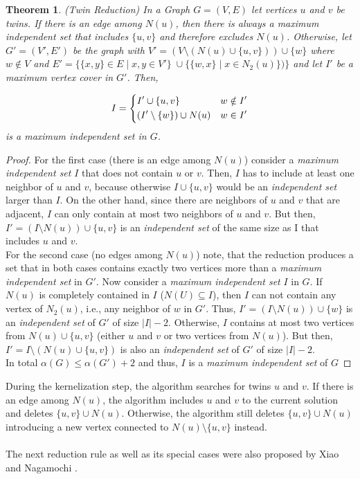 \documentclass[]{article}
\newtheorem{theorem}{Theorem}
\begin{document}
\begin{theorem} (Twin Reduction) In a Graph $G=(V,E)$ let vertices $u$ and $v$ be twins. If there is an edge among $N(u)$, then there is always a \textit{maximum independent set} that includes $\{u,v\}$ and therefore excludes $N(u)$. Otherwise, let $G'=(V',E')$ be the graph with $V'=(V\setminus(N(u)\cup\{u,v\}))\cup\{w\}$ where $w\notin V$ and $E'=\{\{x,y\}\in E\;|\;x,y\in V'\}\;\cup \{\{w,x\}\;|\;x\in N_2(u)\})\}$ and let $I'$ be a \textit{maximum vertex cover} in $G'$. Then, 
	
	\[I=\begin{dcases}
	I'\cup \{u,v\} & w\notin I'\\
	(I'\setminus \{w\})\cup N(u) & w\in I'
	\end{dcases}\]
	is a \textit{maximum independent set} in $G$.
\end{theorem}
\begin{proof}
	For the first case (there is an edge among $N(u)$) consider a \textit{maximum independent set} $I$ that does not contain $u$ or $v$. Then, $I$ has to include at least one neighbor of $u$ and $v$, because otherwise $I\cup \{u,v\}$ would be an \textit{independent set} larger than $I$. On the other hand, since there are neighbors of $u$ and $v$ that are adjacent, $I$ can only contain at most two neighbors of $u$ and $v$. But then, $I' = (I\setminus N(u))\cup\{u,v\}$ is an \textit{independent set} of the same size as I that includes $u$ and $v$.\\
	For the second case (no edges among $N(u)$) note, that the reduction produces a set that in both cases contains exactly two vertices more than a \textit{maximum independent set} in $G'$. Now consider a \textit{maximum independent set} $I$ in $G$. If $N(u)$ is completely contained in $I$ ($N(U)\subseteq I$), then $I$ can not contain any vertex of $N_2(u)$, i.e., any neighbor of $w$ in $G'$. Thus, $I' = (I\setminus N(u))\cup\{w\}$ is an \textit{independent set} of $G'$ of size $|I| - 2$. Otherwise, $I$ contains at most two vertices from $N(u)\cup\{u,v\}$ (either $u$ and $v$ or two vertices from $N(u)$). But then, $I' = I\setminus(N(u)\cup\{u,v\})$ is also an \textit{independent set} of $G'$ of size $|I|-2$.\\
	In total $\alpha(G) \leq \alpha(G')+2$ and thus, $I$ is a \textit{maximum independent set} of $G$
	\end{proof}

During the kernelization step, the algorithm searches for twins $u$ and $v$. If there is an edge among $N(u)$, the algorithm includes $u$ and $v$ to the current solution and deletes $\{u,v\}\cup N(u)$. Otherwise, the algorithm still deletes $\{u,v\}\cup N(u)$ introducing a new vertex connected to $N(u)\setminus\{u,v\}$ instead.\\\\
The next reduction rule as well as its special cases were also proposed by Xiao and Nagamochi \cite{XiaoUnconfined}.
\end{document}

